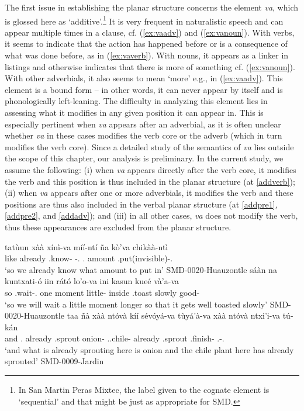 \documentclass[output=paper]{langscibook}
\begin{document}
The first issue in establishing the planar structure concerns the element \textit{va}, which is glossed here as `additive'.\footnote{In San Martin Peras Mixtec, the label given to the cognate element is `sequential' and that might be just as appropriate for SMD.}
It is very frequent in naturalistic speech and can appear multiple times in a clause, cf. (\ref{ex:vaadv}) and (\ref{ex:vanoun}). With verbs, it seems to indicate that the action has happened before or is a consequence of what was done before, as in (\ref{ex:vaverb}). With nouns, it appears as a linker in listings and otherwise indicates that there is more of something cf. (\ref{ex:vanoun}). With other adverbials, it also seems to mean `more' e.g., in (\ref{ex:vaadv}). 
This element is a bound form -- in other words, it can never appear by itself and is phonologically left-leaning.
The difficulty in analyzing this element lies in assessing what it modifies in any given position it can appear in. This is especially pertinent when \textit{va} appears after an adverbial, as it is often unclear whether \textit{va} in these cases modifies the verb core or the adverb (which in turn modifies the verb core). Since a detailed study of the semantics of \textit{va} lies outside the scope of this chapter, our analysis is preliminary. 
In the current study, we assume the following: (i) when \textit{va} appears directly after the verb core, it modifies the verb and this position is thus included in the planar structure (at \ref{addverb}); (ii) when \textit{va} appears after one or more adverbials, it modifies the verb and these positions are thus also included in the verbal planar structure (at \ref{addpre1}, \ref{addpre2}, and \ref{addadv}); and (iii) in all other cases, \textit{va} does not modify the verb, thus these appearances are excluded from the planar structure.

\ea
 \ea \label{ex:vaverb}
	\gll tatùun xàà xínì-va míí-ntí ña kò'va chikàà-ntì	\\
		like already \Incmpl.know-\Add{} \Top-\Fpl.\Excl{} \Clf.\Thing{} amount \Pot.put(invisible)-\Fpl.\Excl{}			\\
	\glt `so we already know what amount to put in' \hfill SMD-0020-Huauzontle
    \ex \label{ex:vaadv}
	\gll sáàn na kuntxati-ó iin rátó lo'o-va ini kasun kueé và'a-va \\
		so \Mod{} \Pot.wait-\Fpl.\Incl{} one moment little-\Add{} inside \Pot.toast slowly good-\Add{}		\\
	\glt `so we will wait a little moment longer so that it gets well toasted slowly' \hfill SMD-0020-Huauzontle
    \ex \label{ex:vanoun}
	\gll taa ñà xàà ntóvà kíí sévóyá-va tùyá'à-va xàà ntóvà ntxi'i-va tú-kán 	\\
		and \Clf.\Thing{} already \Incmpl.sprout \Cop{} onion-\Add{} \Clf.\Wood.chile-\Add{} already \Incmpl.sprout \Pot.finish-\Add{} \Clf.\Wood-\Dem.\Prox{}			\\
	\glt `and what is already sprouting here is onion and the chile plant here has already sprouted' \hfill SMD-0009-Jardin
 \z
\z
\end{document}
